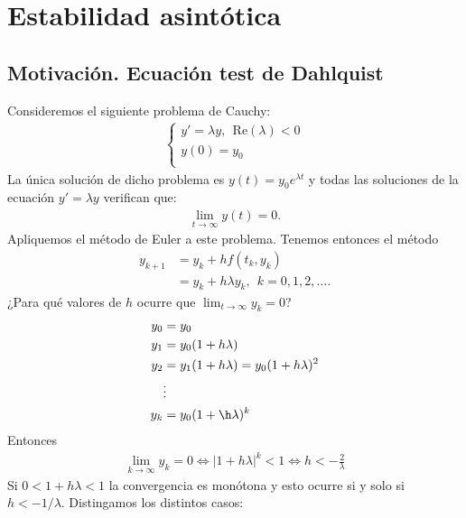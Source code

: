 \chapter{Estabilidad asintótica}

\section{Motivación. Ecuación test de Dahlquist}

\noindent Consideremos el siguiente problema de Cauchy:
\begin{align*}
    \left\{ \begin{array}{lcc}
             y' = \lambda y, \ \ \text{Re}(\lambda) < 0\\
             y(0) = y_0 \\
             \end{array}
   \right.
\end{align*}
La única solución de dicho problema es $y(t) = y_0e^{\lambda t}$ y todas las soluciones de la ecuación $y' = \lambda y$ verifican que:
\begin{align*}
    \lim_{t \to \infty} y(t) = 0.
\end{align*}
Apliquemos el método de Euler a este problema. Tenemos entonces el método
\begin{align*}
    y_{k+1} &= y_k + hf(t_k,y_k) \\ 
            &= y_k + h\lambda y_k, \ \ k = 0,1,2,\ldots.
\end{align*}
¿Para qué valores de $h$ ocurre que $\lim_{t \to \infty} y_k = 0$?
\begin{align*}
    y_0 &= y_0 \\
    y_1 &= y_0(1+ h\lambda) \\
    y_2 &= y_1(1+ h\lambda) = y_0(1+ h\lambda)^2 \\
    &\vdots \\
    y_k &= y_0(1+\h\lambda)^k
\end{align*}
Entonces
\begin{align*}
    \lim_{k \to \infty} y_k = 0 \Longleftrightarrow |1+ h\lambda|^k < 1 \Longleftrightarrow h < -\frac{2}{\lambda}
\end{align*}
Si $0 < 1 +h\lambda < 1$ la convergencia es monótona y esto ocurre si y solo si $h < -1/\lambda$. Distingamos los distintos casos:
